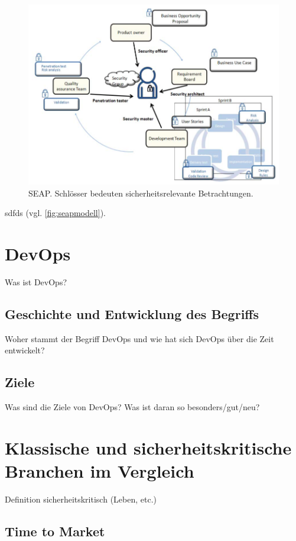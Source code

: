 \begin{figure}
  \centering
  \includegraphics[width=\textwidth]{img/seapmodell.png}
  \caption{SEAP. Schlösser bedeuten sicherheitsrelevante Betrachtungen. \parencite[Vgl.][]{Baca:2015aa}}
  \label{fig:seapmodell}
\end{figure}

sdfds (vgl. \autoref{fig:seapmodell}).


\section{DevOps} %
Was ist DevOps?

\subsection{Geschichte und Entwicklung des Begriffs}
Woher stammt der Begriff DevOps und wie hat sich DevOps über die Zeit entwickelt?

\subsection{Ziele}
Was sind die Ziele von DevOps? Was ist daran so besonders/gut/neu?

\section{Klassische und sicherheitskritische Branchen im Vergleich} %

Definition sicherheitskritisch (Leben, etc.)

\subsection{Time to Market}

